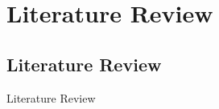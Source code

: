 \chapter{Literature Review}
\label{Literature Review}
  \singlespace
  \onehalfspace
  \acresetall

\section{Literature Review}
\label{sec:Literature Review}
Literature Review